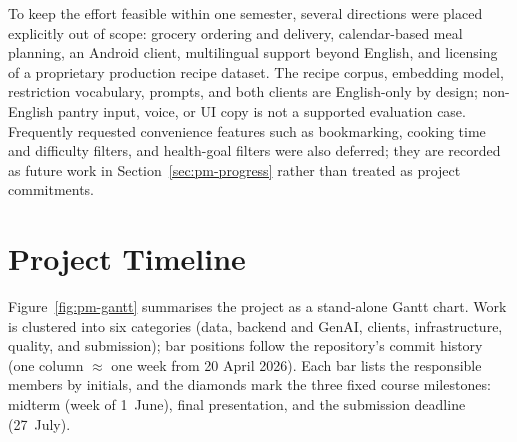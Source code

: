 To keep the effort feasible within one semester, several directions were placed
explicitly out of scope: grocery ordering and delivery, calendar-based meal
planning, an Android client, multilingual support beyond English, and licensing
of a proprietary production recipe dataset. The recipe corpus, embedding model,
restriction vocabulary, prompts, and both clients are English-only by design;
non-English pantry input, voice, or UI copy is not a supported evaluation case.
Frequently requested convenience features such as bookmarking, cooking time and
difficulty filters, and health-goal filters were also deferred; they are recorded
as future work in Section~\ref{sec:pm-progress} rather than treated as project
commitments.

\section{Project Timeline}
\label{sec:pm-timeline}

Figure~\ref{fig:pm-gantt} summarises the project as a stand-alone Gantt chart.
Work is clustered into six categories (data, backend and GenAI, clients,
infrastructure, quality, and submission); bar positions follow the repository's
commit history (one column $\approx$ one week from 20 April 2026). Each bar
lists the responsible members by initials, and the diamonds mark the three
fixed course milestones: midterm (week of 1~June), final presentation, and the
submission deadline (27~July).


